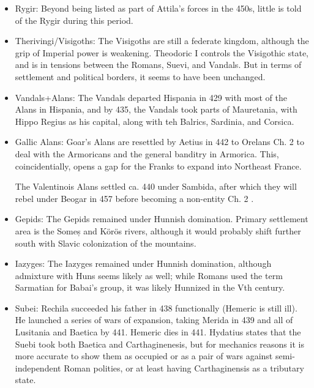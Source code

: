 \documentclass{article}
\newcommand{\specificCite}[1]{\tiny #1 \normalsize}
\begin{document}
\begin{itemize}
		\item Rygir:\newline
		Beyond being listed as part of Attila's forces in the 450s, little is told of the Rygir during this period.
		
		\item Therivingi/Visigoths:\newline
		The Visigoths are still a federate kingdom, although the grip of Imperial power is weakening.
		Theodoric I controls the Visigothic state, and is in tensions between the Romans, Suevi, and Vandals.
		But in terms of settlement and political borders, it seems to have been unchanged.
		
		\item Vandals+Alans:\newline
		The Vandals departed Hispania in 429 with most of the Alans in Hispania, and by 435, the Vandals took parts of Mauretania, with Hippo Regius as his capital, along with teh Balrics, Sardinia, and Corsica. 
		
		\item Gallic Alans:\newline
		Goar's Alans are resettled by Aetius in 442 to Orelans \cite{BachrachAlans}\specificCite{Ch. 2} to deal with the Armoricans and the general banditry in Armorica.
		This, coincidentially, opens a gap for the Franks to expand into Northeast France.
		
		The Valentinois Alans settled ca. 440 under Sambida, after which they will rebel under Beogar in 457 before becoming a non-entity \cite{BachrachAlans}\specificCite{Ch. 2}.
		
		\item Gepids:\newline
		The Gepids remained under Hunnish domination.
		Primary settlement area is the Someș and Körös rivers, although it would probably shift further south with Slavic colonization of the mountains.
		
		\item Iazyges:\newline
		The Iazyges remained under Hunnish domination, although admixture with Huns seems likely as well; while Romans used the term Sarmatian for Babai's group, it was likely Hunnized in the Vth century.
		
		\item Subei:\newline
		Rechila succeeded his father in 438 functionally (Hemeric is still ill).
		He launched a series of wars of expansion, taking Merida in 439 and all of Lusitania and Baetica by 441.
		Hemeric dies in 441.
		Hydatius states that the Suebi took both Baetica and Carthaginenesis, but for mechanics reasons it is more accurate to show them as occupied or as a pair of wars against semi-independent Roman polities, or at least having Carthaginensis as a tributary state.
		

\end{itemize}
\end{document}

